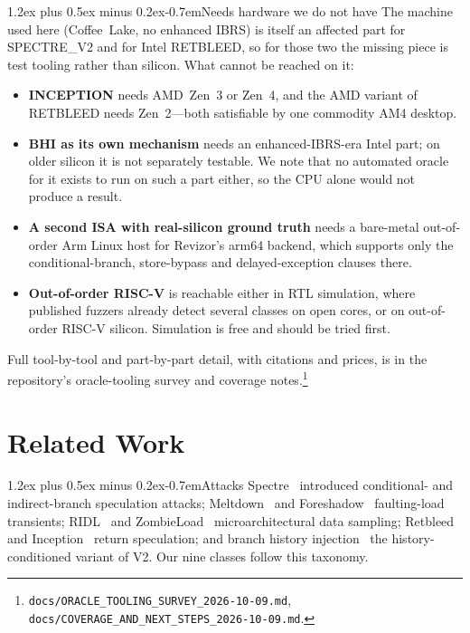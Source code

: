 \documentclass[conference]{IEEEtran}
\makeatletter
\renewcommand\paragraph{\@startsection{paragraph}{4}{\z@}%
  {1.2ex plus 0.5ex minus 0.2ex}{-0.7em}{\normalfont\normalsize\bfseries}}
\makeatother
\begin{document}
\paragraph{Needs hardware we do not have}
The machine used here (Coffee~Lake, no enhanced IBRS) is itself an affected
part for SPECTRE\_V2 and for Intel RETBLEED, so for those two the missing piece
is test tooling rather than silicon. What cannot be reached on it:
\begin{itemize}[itemsep=1pt,leftmargin=1.2em]
  \item \textbf{INCEPTION} needs AMD~Zen~3 or Zen~4, and the AMD variant of
    RETBLEED needs Zen~2---both satisfiable by one commodity AM4 desktop.
  \item \textbf{BHI as its own mechanism} needs an enhanced-IBRS-era Intel
    part; on older silicon it is not separately testable. We note that no
    automated oracle for it exists to run on such a part either, so the CPU
    alone would not produce a result.
  \item \textbf{A second ISA with real-silicon ground truth} needs a
    bare-metal out-of-order Arm Linux host for Revizor's arm64 backend, which
    supports only the conditional-branch, store-bypass and
    delayed-exception clauses there.
  \item \textbf{Out-of-order RISC-V} is reachable either in RTL simulation,
    where published fuzzers already detect several classes on open cores, or on
    out-of-order RISC-V silicon. Simulation is free and should be tried first.
\end{itemize}
Full tool-by-tool and part-by-part detail, with citations and prices, is in
the repository's oracle-tooling survey and coverage notes.\footnote{{\raggedright\texttt{docs/ORACLE\_TOOLING\_SURVEY\_2026-10-09.md},
\texttt{docs/COVERAGE\_AND\_NEXT\_STEPS\_2026-10-09.md}.\par}}


\section{Related Work}
\label{sec:related}

\paragraph{Attacks} Spectre~\cite{kocher2019spectre} introduced conditional- and
indirect-branch speculation attacks; Meltdown~\cite{lipp2018meltdown} and
Foreshadow~\cite{vanbulck2018foreshadow} faulting-load transients;
RIDL~\cite{vanschaik2019ridl} and ZombieLoad~\cite{schwarz2019zombieload}
microarchitectural data sampling; Retbleed~\cite{wikner2022retbleed} and
Inception~\cite{trujillo2023inception} return speculation; and branch history
injection~\cite{barberis2022bhi} the history-conditioned variant of V2. Our nine
classes follow this taxonomy.
\end{document}
